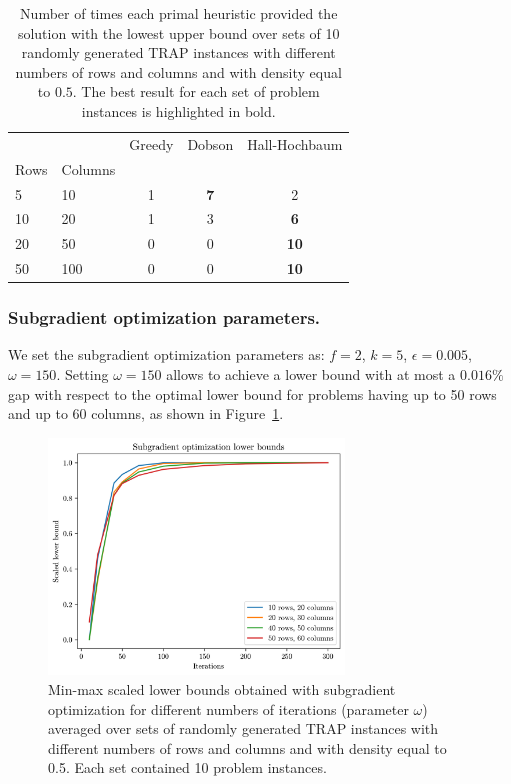 \documentclass[runningheads]{llncs}
\begin{document}
\begin{table}
  \caption{Number of times each primal heuristic provided the solution with the lowest upper bound over sets of 10 randomly generated TRAP instances with different numbers of rows and columns and with density equal to $0.5$. The best result for each set of problem instances is highlighted in bold.}
  \label{tab:results:primal}
  \centering
  \begin{tabular}{llccc}
    \toprule
     &  & Greedy & Dobson & Hall-Hochbaum \\
    Rows & Columns &  &  &  \\
    \midrule
    5 & 10 & 1 & \bfseries 7 & 2 \\
    10 & 20 & 1 & 3 & \bfseries 6 \\
    20 & 50 & 0 & 0 & \bfseries 10 \\
    50 & 100 & 0 & 0 & \bfseries 10 \\
    \bottomrule
    \end{tabular}
  \end{table}

\subsubsection{Subgradient optimization parameters.} We set the subgradient optimization parameters as: $f=2$, $k=5$, $\epsilon=0.005$, $\omega=150$. Setting $\omega=150$ allows to achieve a lower bound with at most a $0.016\%$ gap with respect to the optimal lower bound for problems having up to 50 rows and up to 60 columns, as shown in Figure~\ref{fig:results:subgrad}.

\begin{figure}
  \center
  \includegraphics[width=0.7\textwidth]{img/subgrad_lb.png}
  \caption{Min-max scaled lower bounds obtained with subgradient optimization for different numbers of iterations (parameter $\omega$) averaged over sets of randomly generated TRAP instances with different numbers of rows and columns and with density equal to 0.5. Each set contained 10 problem instances.} 
  \label{fig:results:subgrad}
\end{figure}
\end{document}
